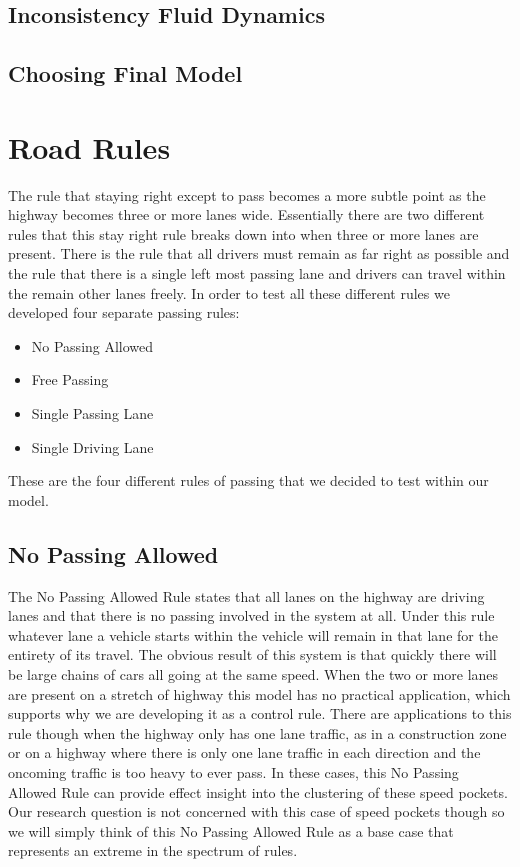 \documentclass{amsart}
\begin{document}
	\subsection{Inconsistency Fluid Dynamics}
	\subsection{Choosing Final Model}

\section{\bfseries{Road Rules}}
	The rule that staying right except to pass becomes a more subtle point as the highway becomes three or more lanes wide.  Essentially there are two different rules that this stay right rule breaks down into when three or more lanes are present.  There is the rule that all drivers must remain as far right as possible and the rule that there is a single left most passing lane and drivers can travel within the remain other lanes freely.  In order to test all these different rules we developed four separate passing rules:
		\begin{itemize}
			\item No Passing Allowed
			\item Free Passing
			\item Single Passing Lane
			\item Single Driving Lane
		\end{itemize}
	These are the four different rules of passing that we decided to test within our model.

	\subsection{No Passing Allowed}
	The No Passing Allowed Rule states that all lanes on the highway are driving lanes and that there is no passing involved in the system at all.  Under this rule whatever lane a vehicle starts within the vehicle will remain in that lane for the entirety of its travel.  The obvious result of this system is that quickly there will be large chains of cars all going at the same speed.  When the two or more lanes are present on a stretch of highway this model has no practical application, which supports why we are developing it as a control rule.  There are applications to this rule though when the highway only has one lane traffic, as in a construction zone or on a highway where there is only one lane traffic in each direction and the oncoming traffic is too heavy to ever pass.  In these cases, this No Passing Allowed Rule can provide effect insight into the clustering of these speed pockets.  Our research question is not concerned with this case of speed pockets though so we will simply think of this No Passing Allowed Rule as a base case that represents an extreme in the spectrum of rules.  
\end{document}

